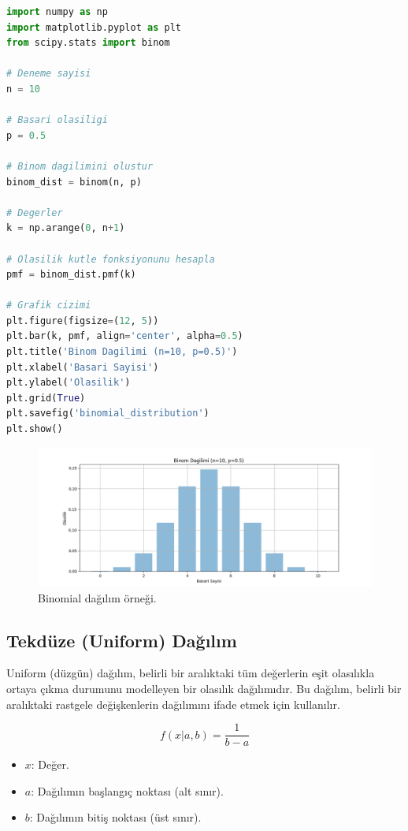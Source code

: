 \begin{lstlisting}[language=Python]
import numpy as np
import matplotlib.pyplot as plt
from scipy.stats import binom

# Deneme sayisi
n = 10

# Basari olasiligi
p = 0.5

# Binom dagilimini olustur
binom_dist = binom(n, p)

# Degerler
k = np.arange(0, n+1)

# Olasilik kutle fonksiyonunu hesapla
pmf = binom_dist.pmf(k)

# Grafik cizimi
plt.figure(figsize=(12, 5))
plt.bar(k, pmf, align='center', alpha=0.5)
plt.title('Binom Dagilimi (n=10, p=0.5)')
plt.xlabel('Basari Sayisi')
plt.ylabel('Olasilik')
plt.grid(True)
plt.savefig('binomial_distribution')
plt.show()
\end{lstlisting}

\begin{figure}[h]
    \centering
    \includegraphics[width=1\textwidth]{images/binomial_distribution.png}
    \caption{Binomial dağılım örneği.}
    \label{fig:enter-label}
\end{figure}

\subsection{Tekdüze (Uniform) Dağılım}
Uniform (düzgün) dağılım, belirli bir aralıktaki tüm değerlerin eşit olasılıkla ortaya çıkma durumunu modelleyen bir olasılık dağılımıdır. Bu dağılım, belirli bir aralıktaki rastgele değişkenlerin dağılımını ifade etmek için kullanılır.

\[f(x|a,b) = \frac{1}{b-a}\]
\begin{itemize}
	\item $x$: Değer.
	\item $a$: Dağılımın başlangıç noktası (alt sınır).
	\item $b$: Dağılımın bitiş noktası (üst sınır).
\end{itemize}

